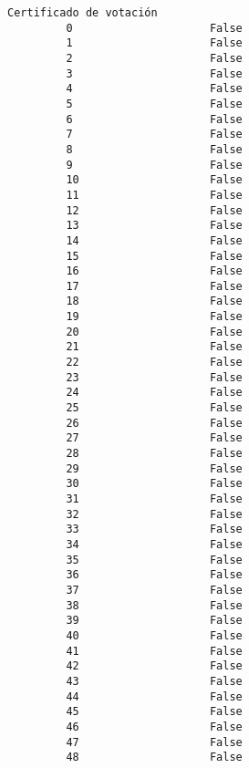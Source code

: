 \documentclass[11pt]{article}
\begin{document}
\begin{Verbatim}[commandchars=\\\{\}]
             Certificado de votación  
         0                     False  
         1                     False  
         2                     False  
         3                     False  
         4                     False  
         5                     False  
         6                     False  
         7                     False  
         8                     False  
         9                     False  
         10                    False  
         11                    False  
         12                    False  
         13                    False  
         14                    False  
         15                    False  
         16                    False  
         17                    False  
         18                    False  
         19                    False  
         20                    False  
         21                    False  
         22                    False  
         23                    False  
         24                    False  
         25                    False  
         26                    False  
         27                    False  
         28                    False  
         29                    False  
         30                    False  
         31                    False  
         32                    False  
         33                    False  
         34                    False  
         35                    False  
         36                    False  
         37                    False  
         38                    False  
         39                    False  
         40                    False  
         41                    False  
         42                    False  
         43                    False  
         44                    False  
         45                    False  
         46                    False  
         47                    False  
         48                    False  
\end{Verbatim}
            
\end{document}
